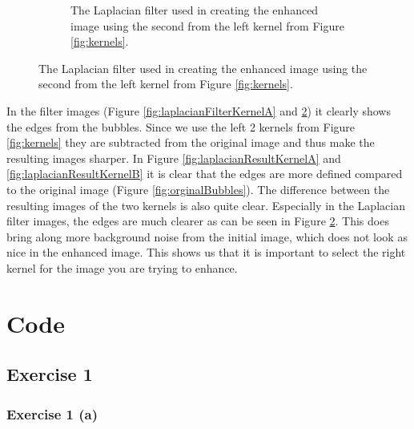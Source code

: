 \documentclass{article}
\begin{document}
\begin{figure}[H]
\begin{subfigure}[t]{0.40\textwidth}
        \caption{The Laplacian filter used in creating the enhanced image using the second from the left kernel from Figure \ref{fig:kernels}.}
        \label{fig:laplacianFilterKernelB}
    \end{subfigure}
\end{figure}

In the filter images (Figure \ref{fig:laplacianFilterKernelA} and \ref{fig:laplacianFilterKernelB}) it clearly shows the edges from the bubbles. Since we use the left 2 kernels from Figure \ref{fig:kernels} they are subtracted from the original image and thus make the resulting images sharper. In Figure \ref{fig:laplacianResultKernelA} and \ref{fig:laplacianResultKernelB} it is clear that the edges are more defined compared to the original image (Figure \ref{fig:orginalBubbles}). The difference between the resulting images of the two kernels is also quite clear. Especially in the Laplacian filter images, the edges are much clearer as can be seen in Figure \ref{fig:laplacianFilterKernelB}. This does bring along more background noise from the initial image, which does not look as nice in the enhanced image. This shows us that it is important to select the right kernel for the image you are trying to enhance.




\appendix
\section{Code}
\subsection{Exercise 1}


\subsubsection{Exercise 1 (a)}

\end{document}
